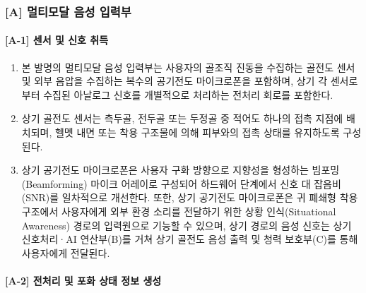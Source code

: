 \documentclass{article}
\DeclareRobustCommand{\vtwoedit}[1]{\textcolor{customgreen}{#1}}
\begin{document}
\subsubsection{[A] 멀티모달 음성 입력부}

\paragraph{[A-1] 센서 및 신호 취득}

\begin{enumerate}[label = \textbf{(A.1.\arabic*)}]

    \item 본 발명의 멀티모달 음성 입력부는 사용자의 골조직 진동을 수집하는 골전도 센서 및 외부 음압을 수집하는 복수의 공기전도 마이크로폰을 포함하며, 상기 각 센서로부터 수집된 아날로그 신호를 개별적으로 처리하는 전처리 회로를 포함한다.

    \item 상기 골전도 센서는 측두골, 전두골 또는 두정골 중 적어도 하나의 접촉 지점에 배치되며, 헬멧 내면 또는 착용 구조물에 의해 피부와의 접촉 상태를 유지하도록 구성된다.

    \item 상기 공기전도 마이크로폰은 사용자 구화 방향으로 지향성을 형성하는 빔포밍(Beamforming) 마이크 어레이로 구성되어 하드웨어 단계에서 신호 대 잡음비(SNR)를 일차적으로 개선한다. 
    또한, 상기 공기전도 마이크로폰은 귀 폐쇄형 착용 구조에서 사용자에게 외부 환경 소리를 전달하기 위한 상황 인식(Situational Awareness) 경로의 입력원으로 기능할 수 있으며, 상기 경로의 음성 신호는 상기 신호처리·AI 연산부(B)를 거쳐 상기 골전도 음성 출력 및 청력 보호부(C)를 통해 사용자에게 전달된다.

\end{enumerate}


\paragraph{\vtwoedit{[A-2] 전처리 및 포화 상태 정보 생성}}
\end{document}
